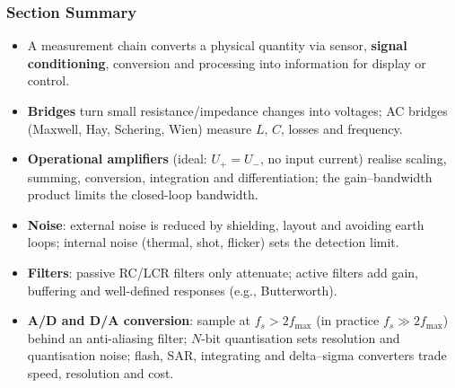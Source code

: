 \begin{frame}
	\frametitle{Section Summary}
	\begin{itemize}
		\item A measurement chain converts a physical quantity via sensor, \textbf{signal conditioning}, conversion and processing into information for display or control.
		\item \textbf{Bridges} turn small resistance/impedance changes into voltages; AC bridges (Maxwell, Hay, Schering, Wien) measure $L$, $C$, losses and frequency.
		\item \textbf{Operational amplifiers} (ideal: $U_+ = U_-$, no input current) realise scaling, summing, conversion, integration and differentiation; the gain--bandwidth product limits the closed-loop bandwidth.
		\item \textbf{Noise}: external noise is reduced by shielding, layout and avoiding earth loops; internal noise (thermal, shot, flicker) sets the detection limit.
		\item \textbf{Filters}: passive RC/LCR filters only attenuate; active filters add gain, buffering and well-defined responses (e.g., Butterworth).
		\item \textbf{A/D and D/A conversion}: sample at $f_s > 2 f_{\max}$ (in practice $f_s \gg 2 f_{\max}$) behind an anti-aliasing filter; $N$-bit quantisation sets resolution and quantisation noise; flash, SAR, integrating and delta--sigma converters trade speed, resolution and cost.
	\end{itemize}
\end{frame}
